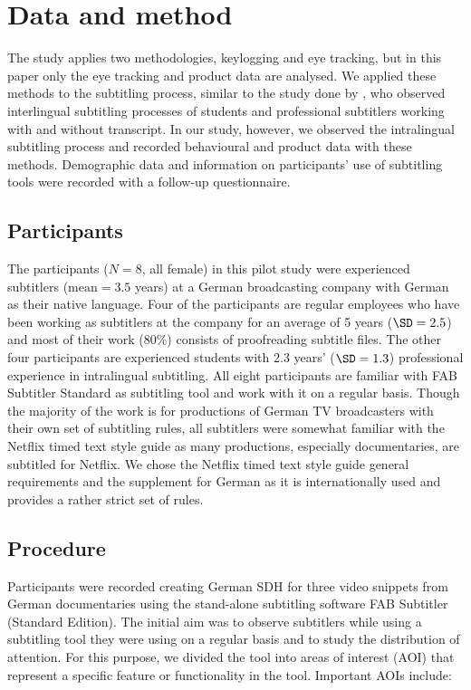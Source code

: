 \documentclass[output=paper]{langscibook}
\begin{document}
\section{Data and method}
The study applies two methodologies, keylogging and eye tracking, but in this paper only the eye tracking and product data are analysed.
We applied these methods to the subtitling process, similar to the study done by \citet{orrego2018using}, who observed interlingual subtitling processes of students and professional subtitlers working with and without transcript.
In our study, however, we observed the intralingual subtitling process and recorded behavioural and product data with these methods.
Demographic data and information on participants' use of subtitling tools were recorded with a follow-up questionnaire.

\subsection{Participants}\label{sec:tardel:4.1}
The participants ($N=8$, all female) in this pilot study were experienced subtitlers ($\text{mean} =3.5$ years) at a German broadcasting company with German as their native language.
Four of the participants are regular employees who have been working as subtitlers at the company for an average of 5 years ($\SD=2.5$) and most of their work ($80\%$) consists of proofreading subtitle files.
The other four participants are experienced students with 2.3 years' ($\SD=1.3$) professional experience in intralingual subtitling.
All eight participants are familiar with FAB Subtitler Standard as subtitling tool and work with it on a regular basis.
Though the majority of the work is for productions of German TV broadcasters with their own set of subtitling rules, all subtitlers were somewhat familiar with the Netflix timed text style guide \citep{netflix2018timed} as many productions, especially documentaries, are subtitled for Netflix.
We chose the Netflix timed text style guide general requirements \citep{netflix2018timed} and the supplement for German as it is internationally used and provides a rather strict set of rules.

\subsection{Procedure} 
Participants were recorded creating German SDH for three video snippets from German documentaries using the stand-alone subtitling software FAB Subtitler (Standard Edition).
The initial aim was to observe subtitlers while using a subtitling tool they were using on a regular basis and to study the distribution of attention.
For this purpose, we divided the tool into areas of interest (AOI) that represent a specific feature or functionality in the tool.
Important AOIs include:
\end{document}
